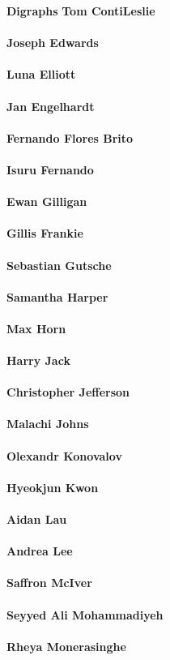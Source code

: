 \documentclass[a4paper,11pt]{report}
\newcommand{\maintitlesize}{\fontsize{50}{55}\selectfont}
\begin{document}
\begin{titlepage}
\begin{center}{\maintitlesize \textbf{ Digraphs \mbox{}}}
{\Large \textbf{ Tom Conti\texttt{}Leslie\\
   \mbox{}}}\\
{\Large \textbf{ Joseph Edwards\\
    \mbox{}}}\\
{\Large \textbf{ Luna Elliott\\
   \mbox{}}}\\
{\Large \textbf{ Jan Engelhardt\\
   \mbox{}}}\\
{\Large \textbf{ Fernando Flores Brito\\
  \mbox{}}}\\
{\Large \textbf{ Isuru Fernando\\
  \mbox{}}}\\
{\Large \textbf{ Ewan Gilligan\\
  \mbox{}}}\\
{\Large \textbf{ Gillis Frankie\\
  \mbox{}}}\\
{\Large \textbf{ Sebastian Gutsche\\
  \mbox{}}}\\
{\Large \textbf{ Samantha Harper\\
  \mbox{}}}\\
{\Large \textbf{ Max Horn\\
    \mbox{}}}\\
{\Large \textbf{ Harry Jack\\
  \mbox{}}}\\
{\Large \textbf{ Christopher Jefferson\\
    \mbox{}}}\\
{\Large \textbf{ Malachi Johns\\
  \mbox{}}}\\
{\Large \textbf{ Olexandr Konovalov\\
    \mbox{}}}\\
{\Large \textbf{ Hyeokjun Kwon\\
  \mbox{}}}\\
{\Large \textbf{ Aidan Lau\\
 \mbox{}}}\\
{\Large \textbf{ Andrea Lee\\
  \mbox{}}}\\
{\Large \textbf{ Saffron McIver\\
  \mbox{}}}\\
{\Large \textbf{ Seyyed Ali Mohammadiyeh\\
  \mbox{}}}\\
{\Large \textbf{ Rheya Monerasinghe\\
}}
\end{center}
\end{titlepage}
\end{document}
